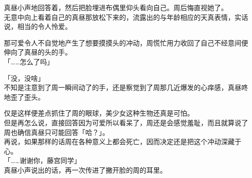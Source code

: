 真昼小声地回答着，然后把脸埋进布偶里仰头看向自己。周后悔直视她了。\\

无意中向上看着自己的真昼那放松下来的，流露出的与年龄相应的天真表情，实话说，相当的令人怜爱。

那可爱令人不自觉地产生了想要摸摸头的冲动，周慌忙用力收回了自己不经意间便伸向了真昼的头的手。\\

「……怎么了吗」

「没，没啥」\\

不知是注意到了周一瞬间动了的手，还是察觉到了周那几近爆发的心痒感，真昼咚地歪了歪头。

仅是这样便差点抓住了周的眼球，美少女这种生物还真是可怕。\\

但是再怎么说，直接回答因为可爱所以看呆了，周还是会感觉羞耻，而且就算说了周也确信真昼只可能回答「哈？」。\\

再说，如果那样的话周在各种意义上都会死亡，因而决定还是把这个冲动深藏于心。\\

「……谢谢你，藤宫同学」\\

真昼小声说出的话，再一次传进了撇开脸的周的耳里。\\

